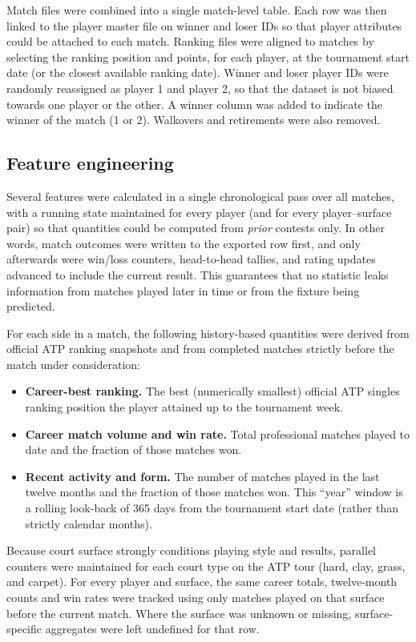 Match files were combined into a single match-level table. Each row was then linked to the player
master file on winner and loser IDs so that player attributes could be attached to each match.
Ranking files were aligned to matches by selecting the ranking position and points, for each player,
at the tournament start date (or the closest available ranking date). Winner and loser player IDs
were randomly reassigned as player 1 and player 2, so that the dataset is not biased towards one
player or the other. A winner column was added to indicate the winner of the match (1 or 2).
Walkovers and retirements were also removed.

\subsection{Feature engineering}
\label{sec:feature-engineering}

Several features were calculated in a single chronological pass over all matches, with a running
state maintained for every player (and for every player--surface pair) so that quantities could be
computed from \emph{prior} contests only. In other words, match outcomes were written to the
exported row first, and only afterwards were win/loss counters, head-to-head tallies, and rating
updates advanced to include the current result. This guarantees that no statistic leaks information
from matches played later in time or from the fixture being predicted.

For each side in a match, the following history-based quantities were derived from official ATP
ranking snapshots and from completed matches strictly before the match under consideration:
\begin{itemize}[leftmargin=*]
  \item \textbf{Career-best ranking.} The best (numerically smallest) official ATP singles ranking
    position the player attained up to the tournament week.
  \item \textbf{Career match volume and win rate.} Total professional matches played to date and
    the fraction of those matches won.
  \item \textbf{Recent activity and form.} The number of matches played in the last
    twelve months and the fraction of those matches won. This ``year'' window is a rolling look-back
    of 365 days from the tournament start date (rather than strictly calendar months).
\end{itemize}

Because court
surface strongly conditions playing style and results, parallel counters were maintained for
each court type on the ATP tour (hard, clay, grass, and carpet). For every player and surface, the
same career totals, twelve-month counts and win rates were tracked using only matches
played on that surface before the current match. Where the surface was unknown or missing,
surface-specific aggregates were left undefined for that row.

